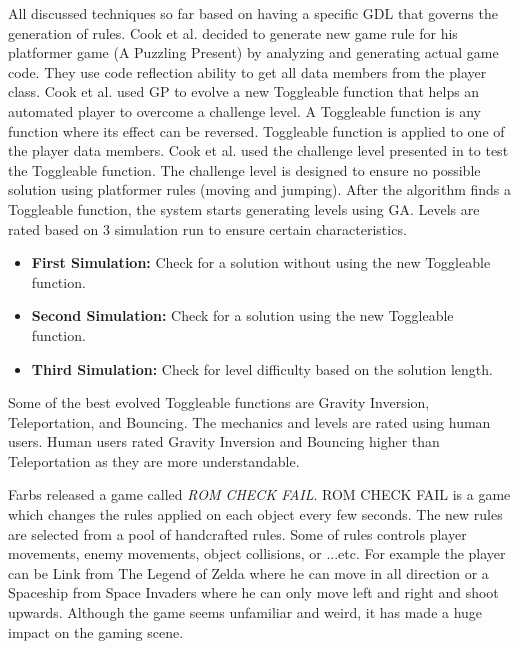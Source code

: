 All discussed techniques so far based on having a specific GDL that governs the generation of rules. Cook et al.\cite{mechanicMiner} decided to generate new game rule for his platformer game (A Puzzling Present) by analyzing and generating actual game code. They use code reflection ability to get all data members from the player class. Cook et al. used GP to evolve a new Toggleable function that helps an automated player to overcome a challenge level. A Toggleable function is any function where its effect can be reversed. Toggleable function is applied to one of the player data members. Cook et al. used the challenge level presented in  to test the Toggleable function. The challenge level is designed to ensure no possible solution using platformer rules (moving and jumping). After the algorithm finds a Toggleable function, the system starts generating levels using GA. Levels are rated based on 3 simulation run to ensure certain characteristics.
\begin{itemize} \itemsep0pt \parskip0pt 
	\item \textbf{First Simulation:} Check for a solution without using the new Toggleable function.
	\item \textbf{Second Simulation:} Check for a solution using the new Toggleable function.
	\item \textbf{Third Simulation:} Check for level difficulty based on the solution length.
\end{itemize}
Some of the best evolved Toggleable functions are Gravity Inversion, Teleportation, and Bouncing. The mechanics and levels are rated using human users. Human users rated Gravity Inversion and Bouncing higher than Teleportation as they are more understandable.\\\par

Farbs released a game called \emph{ROM CHECK FAIL}\cite{romCheckFail}. ROM CHECK FAIL is a game which changes the rules applied on each object every few seconds. The new rules are selected from a pool of handcrafted rules. Some of rules controls player movements, enemy movements, object collisions, or ...etc. For example the player can be Link from The Legend of Zelda where he can move in all direction or a Spaceship from Space Invaders where he can only move left and right and shoot upwards. Although the game seems unfamiliar and weird, it has made a huge impact on the gaming scene.\\\par

